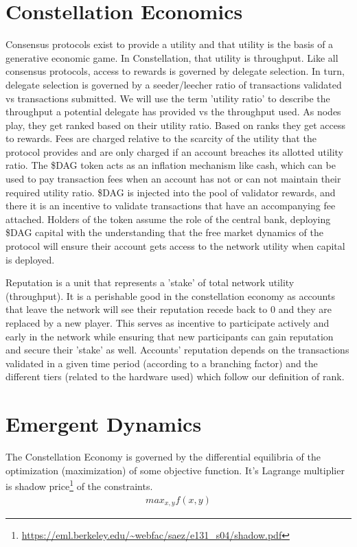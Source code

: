 \documentclass{article}
\begin{document}
\section{Constellation Economics}
Consensus protocols exist to provide a utility and that utility is the basis of a generative economic game. In Constellation, that utility is throughput. Like all consensus protocols, access to rewards is governed by delegate selection. In turn, delegate selection is governed by a seeder/leecher ratio of transactions validated vs transactions submitted. We will use the term 'utility ratio' to describe the throughput a potential delegate has provided vs the throughput used. As nodes play, they get ranked based on their utility ratio. Based on ranks they get access to rewards. Fees are charged relative to the scarcity of the utility that the protocol provides and are only charged if an account breaches its allotted utility ratio. The \$DAG token acts as an inflation mechanism like cash, which can be used to pay transaction fees when an account has not or can not maintain their required utility ratio. \$DAG is injected into the pool of validator rewards, and there it is an incentive to validate transactions that have an accompanying fee attached. Holders of the token assume the role of the central bank, deploying \$DAG capital with the understanding that the free market dynamics of the protocol will ensure their account gets access to the network utility when capital is deployed. 

Reputation is a unit that represents a 'stake' of total network utility (throughput). It is a perishable good in the constellation economy as accounts that leave the network will see their reputation recede back to 0 and they are replaced by a new player. This serves as incentive to participate actively and early in the network while ensuring that new participants can gain reputation and secure their 'stake' as well. Accounts' reputation depends on the transactions validated in a given time period  (according to a branching factor) and the different tiers (related to the hardware used) which follow our definition of rank. 


\section{Emergent Dynamics}
The Constellation Economy is governed by the differential equilibria of the optimization (maximization) of some objective function. It's Lagrange multiplier is shadow price\footnote{\url{https://eml.berkeley.edu/~webfac/saez/e131_s04/shadow.pdf}} of the constraints.
\begin{equation} \label{eq1}
\begin{split}
max_{x, y} f(x, y)
\end{split}
\end{equation}
\end{document}
